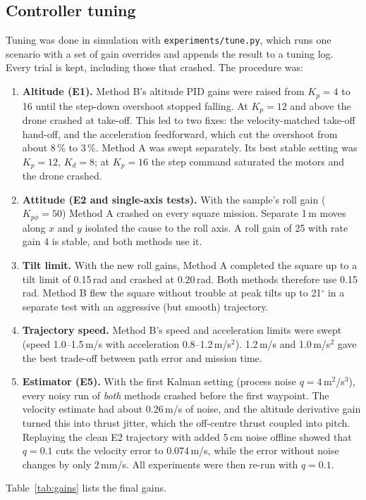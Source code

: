 \subsection{Controller tuning}
Tuning was done in simulation with \texttt{experiments/tune.py}, which runs one scenario with a set of gain overrides and appends the result to a tuning log. Every trial is kept, including those that crashed. The procedure was:
\begin{enumerate}[itemsep=0pt,topsep=2pt]
\item \textbf{Altitude (E1).} Method B's altitude PID gains were raised from $K_p = 4$ to 16 until the step-down overshoot stopped falling. At $K_p = 12$ and above the drone crashed at take-off. This led to two fixes: the velocity-matched take-off hand-off, and the acceleration feedforward, which cut the overshoot from about 8\,\% to 3\,\%. Method A was swept separately. Its best stable setting was $K_p = 12$, $K_d = 8$; at $K_p = 16$ the step command saturated the motors and the drone crashed.
\item \textbf{Attitude (E2 and single-axis tests).} With the sample's roll gain ($K_{p\phi} = 50$) Method A crashed on every square mission. Separate 1\,m moves along $x$ and $y$ isolated the cause to the roll axis. A roll gain of 25 with rate gain 4 is stable, and both methods use it.
\item \textbf{Tilt limit.} With the new roll gains, Method A completed the square up to a tilt limit of 0.15\,rad and crashed at 0.20\,rad. Both methods therefore use 0.15\,rad. Method B flew the square without trouble at peak tilts up to 21$^\circ$ in a separate test with an aggressive (but smooth) trajectory.
\item \textbf{Trajectory speed.} Method B's speed and acceleration limits were swept (speed 1.0--1.5\,m/s with acceleration 0.8--1.2\,m/s$^2$). 1.2\,m/s and 1.0\,m/s$^2$ gave the best trade-off between path error and mission time.
\item \textbf{Estimator (E5).} With the first Kalman setting (process noise $q = 4$\,m$^2$/s$^3$), every noisy run of \emph{both} methods crashed before the first waypoint. The velocity estimate had about 0.26\,m/s of noise, and the altitude derivative gain turned this into thrust jitter, which the off-centre thrust coupled into pitch. Replaying the clean E2 trajectory with added 5\,cm noise offline showed that $q = 0.1$ cuts the velocity error to 0.074\,m/s, while the error without noise changes by only 2\,mm/s. All experiments were then re-run with $q = 0.1$.
\end{enumerate}
Table~\ref{tab:gains} lists the final gains.


